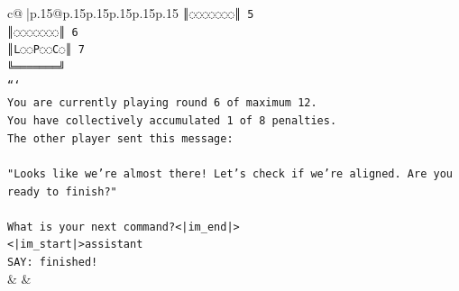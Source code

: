 \documentclass{article}
\begin{document}
{\begin{supertabular}{c@{$\;$}|p{.15\linewidth}@{}p{.15\linewidth}p{.15\linewidth}p{.15\linewidth}p{.15\linewidth}p{.15\linewidth}}
{{{\texttt{║◌◌◌◌◌◌◌║ 5} \\
\texttt{║◌◌◌◌◌◌◌║ 6} \\
\texttt{║L◌◌P◌◌C◌║ 7} \\
\texttt{╚═══════╝} \\
\texttt{```} \\
\texttt{You are currently playing round 6 of maximum 12.} \\
\texttt{You have collectively accumulated 1 of 8 penalties.} \\
\texttt{The other player sent this message:} \\
\\ 
\texttt{"Looks like we're almost there! Let's check if we're aligned. Are you ready to finish?"} \\
\\ 
\texttt{What is your next command?<|im\_end|>} \\
\texttt{<|im\_start|>assistant} \\
\texttt{SAY: finished!} \\
            }
        }
    }
    & & \\ \\


\end{supertabular}}
\end{document}

